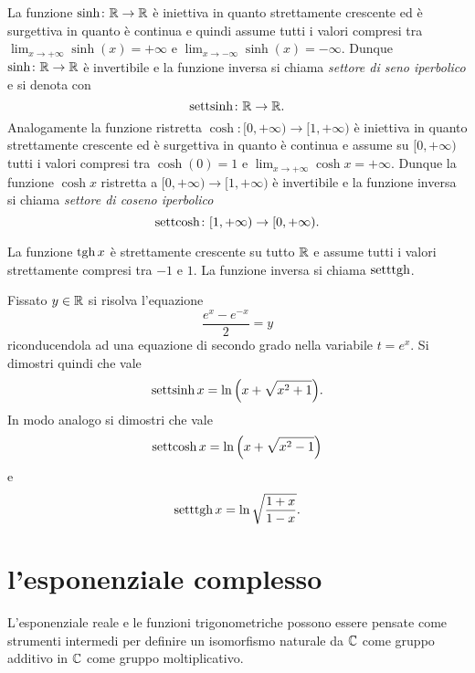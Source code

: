 La funzione $\sinh\colon {\mathbb R}\to{\mathbb R}$ è iniettiva in quanto strettamente crescente ed
è surgettiva in quanto è continua e quindi assume tutti i valori compresi tra
$\lim_{x\to+\infty} \sinh(x) = +\infty$ e $\lim_{x\to -\infty} \sinh(x) = -\infty$. 
Dunque $\sinh\colon {\mathbb R} \to {\mathbb R}$
è invertibile e la funzione inversa si chiama \emph{settore di seno iperbolico}
e si denota con
\mymargin{$\settsinh$}%
\index{$\settsinh$}
\[
    \operatorname{settsinh} \colon {\mathbb R} \to {\mathbb R}.
\]
Analogamente la funzione ristretta $\cosh\colon [0,+\infty)\to [1,+\infty)$ è
iniettiva in quanto strettamente crescente ed è surgettiva in quanto
è continua e assume su $[0,+\infty)$ tutti i valori compresi tra $\cosh(0)=1$ e
$\lim_{x\to +\infty} \cosh x = +\infty$.
Dunque la funzione $\cosh x$ ristretta a $[0,+\infty)\to [1,+\infty)$
è invertibile e la funzione inversa si chiama \emph{settore di coseno iperbolico}
\mymargin{$\settcosh$}%
\index{$\settcosh$}
\[
    \operatorname{settcosh} \colon [1,+\infty)\to [0,+\infty).
\]

La funzione $\operatorname{tgh} x$ è strettamente crescente su tutto ${\mathbb R}$ e assume tutti i valori strettamente compresi tra $-1$ e $1$.
La funzione inversa si chiama $\operatorname{setttgh}$.

\begin{exercise}
Fissato $y\in {\mathbb R}$ si risolva l'equazione
\[
    \frac{e^x - e^{-x}}{2} = y
\]
riconducendola ad una equazione di secondo grado nella variabile $t=e^x$.
Si dimostri quindi che vale
\[
    \operatorname{settsinh} x = \ln{\left( x + \sqrt{x^2 + 1} \right)}.
\]
In modo analogo si dimostri che vale
\[
    \operatorname{settcosh} x = \ln{\left( x + \sqrt{x^2 - 1} \right)}
\]
e
\[
    \operatorname{setttgh} x = \ln \sqrt{\frac{1+x}{1-x}}.
\]
\end{exercise}

\section{l'esponenziale complesso}
\label{sec:esponenziale_complesso}%

L'esponenziale reale e le funzioni trigonometriche possono essere pensate 
come strumenti intermedi per definire un isomorfismo naturale 
da ${\mathbb C}$ come gruppo additivo in ${\mathbb C}$ come gruppo moltiplicativo.

